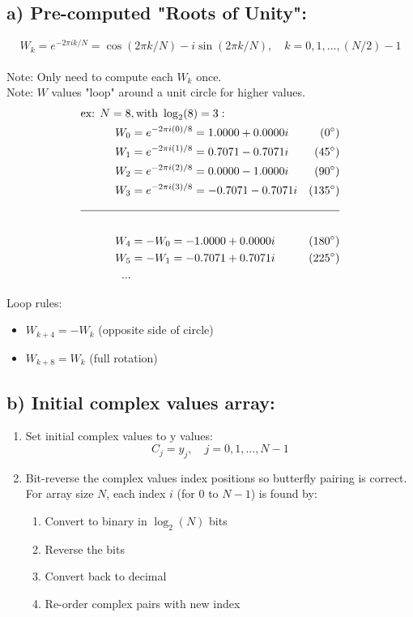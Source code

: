 \documentclass[12pt]{article}
\begin{document}
\subsection*{a) Pre-computed "Roots of Unity":}
\[W_k = e^{-2\pi ik/N} = \cos(2\pi k/N) - i\sin(2\pi k/N), \quad k=0,1,\ldots,(N/2)-1\]
\\
Note: Only need to compute each $W_k$ once.\\
Note: $W$ values "loop" around a unit circle for higher values.\\
\begin{align*}
\text{ex: } N=8&, \text{with } \log_2(8)= 3: \\
W_0 &= e^{-2\pi i(0)/8} = 1.0000+0.0000i &(0^\circ)\\
W_1 &= e^{-2\pi i(1)/8} = 0.7071-0.7071i &(45^\circ)\\
W_2 &= e^{-2\pi i(2)/8} = 0.0000-1.0000i &(90^\circ)\\
W_3 &= e^{-2\pi i(3)/8} = -0.7071-0.7071i &(135^\circ)\\
\cline{1-3}\\
W_4 &= -W_0 = -1.0000+0.0000i &(180^\circ)\\
W_5 &= -W_1 = -0.7071+0.7071i &(225^\circ)\\
...
\end{align*}

Loop rules:
\begin{itemize}
    \item $W_{k+4} = -W_k$ (opposite side of circle)
    \item $W_{k+8} = W_k$ (full rotation)
\end{itemize}

\subsection*{b) Initial complex values array:}
\begin{enumerate}[label=\roman*)]
    \item Set initial complex values to y values:
    \[C_j = y_j, \quad j=0,1,\ldots,N-1\]
    \item Bit-reverse the complex values index positions so butterfly pairing is correct.\\
    For array size $N$, each index $i$ (for 0 to $N-1$) is found by:
    \begin{enumerate}
        \item Convert to binary in $\log_2(N)$ bits
        \item Reverse the bits
        \item Convert back to decimal
        \item Re-order complex pairs with new index
    \end{enumerate}
\end{enumerate}
\end{document}
